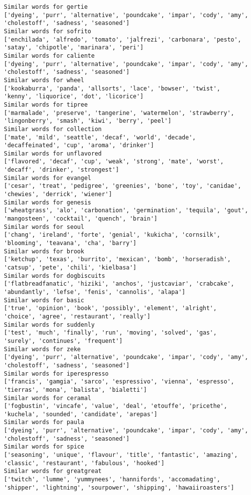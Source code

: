 \documentclass[11pt]{article}
\begin{document}
\begin{Verbatim}[commandchars=\\\{\}]
Similar words for gertie
['dyeing', 'purr', 'alternative', 'poundcake', 'impar', 'cody', 'amy', 'cholestoff', 'sadness', 'seasoned']
Similar words for sofrito
['enchilada', 'alfredo', 'tomato', 'jalfrezi', 'carbonara', 'pesto', 'satay', 'chipotle', 'marinara', 'peri']
Similar words for caliente
['dyeing', 'purr', 'alternative', 'poundcake', 'impar', 'cody', 'amy', 'cholestoff', 'sadness', 'seasoned']
Similar words for wheel
['kookaburra', 'panda', 'allsorts', 'lace', 'bowser', 'twist', 'kenny', 'liquorice', 'dot', 'licorice']
Similar words for tipree
['marmalade', 'preserve', 'tangerine', 'watermelon', 'strawberry', 'lingonberry', 'smash', 'kiwi', 'berry', 'peel']
Similar words for collection
['mate', 'mild', 'seattle', 'decaf', 'world', 'decade', 'decaffeinated', 'cup', 'aroma', 'drinker']
Similar words for unflavored
['flavored', 'decaf', 'cup', 'weak', 'strong', 'mate', 'worst', 'decaff', 'drinker', 'strongest']
Similar words for evangel
['cesar', 'treat', 'pedigree', 'greenies', 'bone', 'toy', 'canidae', 'chewies', 'derrick', 'wiener']
Similar words for genesis
['wheatgrass', 'alo', 'carbonation', 'germination', 'tequila', 'gout', 'mangosteen', 'cocktail', 'quench', 'brain']
Similar words for seoul
['chang', 'ireland', 'forte', 'genial', 'kukicha', 'cornsilk', 'blooming', 'teavana', 'cha', 'barry']
Similar words for brook
['ketchup', 'texas', 'burrito', 'mexican', 'bomb', 'horseradish', 'catsup', 'pete', 'chili', 'kielbasa']
Similar words for dogbiscuits
['flatbreadfanatic', 'hiziki', 'anchos', 'justcaviar', 'crabcake', 'abundantly', 'lefse', 'fenis', 'cannolis', 'alapa']
Similar words for basic
['true', 'opinion', 'book', 'possibly', 'element', 'alright', 'choice', 'agree', 'restaurant', 'really']
Similar words for suddenly
['test', 'much', 'finally', 'run', 'moving', 'solved', 'gas', 'surely', 'continues', 'frequent']
Similar words for zeke
['dyeing', 'purr', 'alternative', 'poundcake', 'impar', 'cody', 'amy', 'cholestoff', 'sadness', 'seasoned']
Similar words for iperespresso
['francis', 'gamgia', 'sarco', 'espressivo', 'vienna', 'espresso', 'tierras', 'mona', 'balista', 'bialetti']
Similar words for ceramal
['fogbustin', 'vincafe', 'value', 'deal', 'etouffe', 'pricethe', 'kuchela', 'sounded', 'candidate', 'arepas']
Similar words for paula
['dyeing', 'purr', 'alternative', 'poundcake', 'impar', 'cody', 'amy', 'cholestoff', 'sadness', 'seasoned']
Similar words for spice
['seasoning', 'unique', 'flavour', 'title', 'fantastic', 'amazing', 'classic', 'restaurant', 'fabulous', 'hooked']
Similar words for greatgreat
['twitch', 'lumme', 'yummynees', 'hannifords', 'accomadating', 'shipper', 'lightning', 'sourpower', 'shipping', 'hawaiiroasters']

\end{Verbatim}
\end{document}
